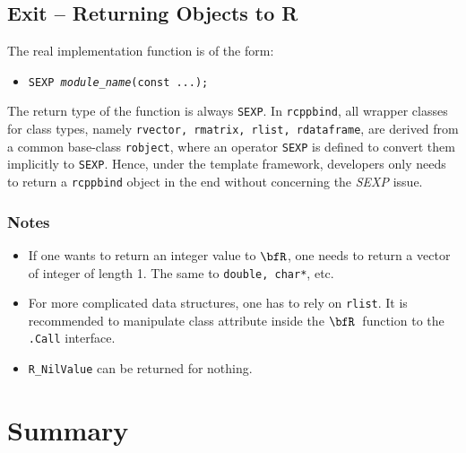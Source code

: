 \documentclass{article}
\newcommand{\R}{$\bfR$}
\begin{document}
\subsection{Exit -- Returning Objects to R}

The real implementation function is of the form:
\begin{itemize}
  \item[] \texttt{SEXP \textsl{module\_name}(const ...);}
\end{itemize}
The return type of the function is always \texttt{SEXP}. In
\texttt{rcppbind}, all wrapper classes for class types,
namely \texttt{rvector, rmatrix, rlist, rdataframe}, are
derived from a common base-class \texttt{robject}, where an
operator \texttt{SEXP} is defined to convert them implicitly
to \texttt{SEXP}. Hence, under the template framework,
developers only needs to return a \texttt{rcppbind} object
in the end without concerning the \textsl{SEXP} issue.

\subsubsection*{Notes}

\begin{itemize}
  \item If one wants to return an integer value to \R, one
    needs to return a vector of integer of length 1.  The
    same to \texttt{double, char*}, etc.
  \item For more complicated data structures, one has to rely
    on \texttt{rlist}. It is recommended to manipulate class
    attribute inside the \R\ function to the \texttt{.Call}
    interface.
  \item \texttt{R\_NilValue} can be returned for nothing.
\end{itemize}

\section{Summary}\label{sec:summary}
\end{document}
